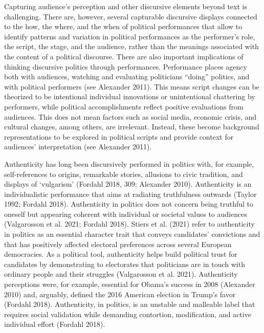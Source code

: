 \documentclass[smallextended]{svjour3}       %
\begin{document}
Capturing audience's perception and other discursive elements beyond
text is challenging. There are, however, several capturable discursive
displays connected to the how, the where, and the when of political
performances that allow to identify patterns and variation in political
performances as the performer's role, the script, the stage, and the
audience, rather than the meanings associated with the content of a
political discourse. There are also important implications of thinking
discursive politics through performances. Performance places agency both
with audiences, watching and evaluating politicians ``doing'' politics,
and with political performers (see Alexander 2011). This means script
changes can be theorized to be intentional individual innovations or
unintentional chattering by performers, while political accomplishments
reflect positive evaluations from audiences. This does not mean factors
such as social media, economic crisis, and cultural changes, among
others, are irrelevant. Instead, these become background representations
to be explored in political scripts and provide context for audiences'
interpretation (see Alexander 2011).

Authenticity has long been discursively performed in politics with, for
example, self-references to origins, remarkable stories, allusions to
civic tradition, and displays of `vulgarism' (Fordahl 2018, 309;
Alexander 2010). Authenticity is an individualistic performance that
aims at radiating truthfulness outwards (Taylor 1992; Fordahl 2018).
Authenticity in politics does not concern being truthful to oneself but
appearing coherent with individual or societal values to audiences
(Valgarosson et al. 2021; Fordahl 2018). Stiers et al. (2021) refer to
authenticity in politics as an essential character trait that conveys
candidates' convictions and that has positively affected electoral
preferences across several European democracies. As a political tool,
authenticity helps build political trust for candidates by demonstrating
to electorates that politicians are in touch with ordinary people and
their struggles (Valgarosson et al. 2021). Authenticity perceptions
were, for example, essential for Obama's success in 2008 (Alexander
2010) and, arguably, defined the 2016 American election in Trump's favor
(Fordahl 2018). Authenticity, in politics, is an unstable and malleable
label that requires social validation while demanding contortion,
modification, and active individual effort (Fordahl 2018).
\end{document}
